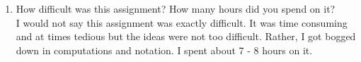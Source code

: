 \documentclass[12pt]{extarticle}
\begin{document}
\begin{enumerate}
\begin{enumerate}
\end{enumerate}




\vfill
\eject


\item How difficult was this assignment?  How many hours did you spend on it?
\bigskip \\
I would not say this assignment was exactly difficult. It was time consuming and at times tedious but the ideas were not too difficult. Rather, I got bogged down in computations and notation. I spent about 7 - 8 hours on it.   

\vfill
\eject

\end{enumerate}
\end{document}
